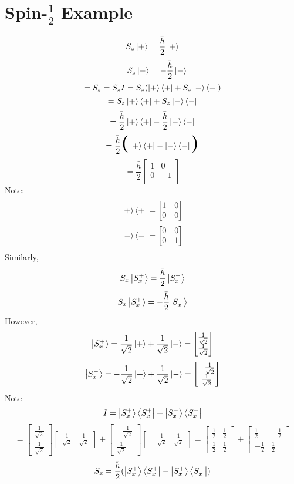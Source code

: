 \documentclass{book}
\begin{document}
\section{Spin-$\frac{1}{2}$ Example}
$$ S_z \ket{+} = \frac{\bar{h}}{2} \ket{+} $$
$$=  S_z \ket{-} = - \frac{\bar{h}}{2} \ket{-} $$
$$= S_z = S_z I = S_z (\ket{+}\bra{+} + S_z \ket{-}\bra{-}) $$
$$= S_z \ket{+} \bra{+} + S_z \ket {-} \bra{-} $$
$$= \frac{\bar{h}}{2} \ket{+}\bra{+} - \frac{\bar{h}}{2} \ket{-}\bra{-}$$
$$= \frac{\bar{h}}{2} \textbf{\huge (} \ket{+}\bra{+}  -  \ket{-}\bra{-} \textbf{\huge)}$$
$$= \frac{\bar{h}}{2} \begin{bmatrix}
 1 & 0 \\
 0 & -1 \\
\end{bmatrix}
$$
Note:
$$ \ket{+} \bra{+} = \begin{bmatrix}
 1 & 0 \\ 0 & 0
\end{bmatrix} $$
$$ \ket{-} \bra{-} = \begin{bmatrix}
 0 & 0 \\ 0 & 1
\end{bmatrix} $$
Similarly, 
$$ S_x \ket{S_x^+} = \frac{\bar{h}}{2}\ket{S_x^+} $$
$$ S_x \ket{S_x^+} = - \frac{\bar{h}}{2}{\ket{S_x^-}} $$
However, 
$$\ket{S_x^+} = \frac{1}{\sqrt{2}} \ket{+} + \frac{1}{\sqrt{2}} \ket{-} = \begin{bmatrix}
\frac{1}{\sqrt{2}} \\ \frac{1}{\sqrt{2}}
\end{bmatrix}$$
$$\ket{S_x^-} =- \frac{1}{\sqrt{2}} \ket{+} + \frac{1}{\sqrt{2}} \ket{-} = \begin{bmatrix}
- \frac{1}{\sqrt{2}} \\ \frac{1}{\sqrt{2}}
\end{bmatrix}$$
Note
$$ I = \ket{S_x^+} \bra{S_x^+} + \ket{S_x^-}\bra{S_x^-}$$
$$ = \begin{bmatrix}
  \frac{1}{\sqrt{2}} \\ \frac{1}{\sqrt{2}}
\end{bmatrix}
\begin{bmatrix}
  \frac{1}{\sqrt{2}} & \frac{1}{\sqrt{2}}
\end{bmatrix} +
 \begin{bmatrix}
  - \frac{1}{\sqrt{2}} \\ \frac{1}{\sqrt{2}}
\end{bmatrix}
\begin{bmatrix}
  - \frac{1}{\sqrt{2}} & \frac{1}{\sqrt{2}}
\end{bmatrix} = 
\begin{bmatrix}
  \frac{1}{2} &  \frac{1}{2} \\
   \frac{1}{2} &  \frac{1}{2}
\end{bmatrix} + 
\begin{bmatrix}
   \frac{1}{2} & - \frac{1}{2} \\
   -  \frac{1}{2} &  \frac{1}{2}
\end{bmatrix}
$$
$$S_x = \frac{\bar{h}}{2} ( \ket{S_x^+} \bra{S_x^+} - \ket{S_x^+} \bra{S_x^-})$$

 
\end{document}
